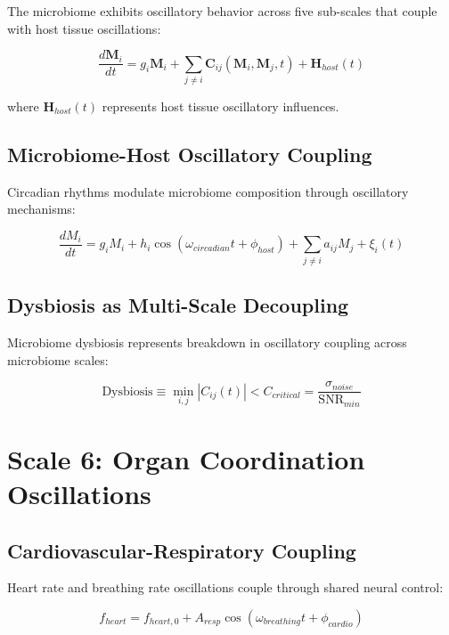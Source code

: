 \documentclass[twocolumn]{article}
\begin{document}
The microbiome exhibits oscillatory behavior across five sub-scales that couple with host tissue oscillations:

\begin{equation}
\frac{d\mathbf{M}_i}{dt} = g_i \mathbf{M}_i + \sum_{j \neq i} \mathbf{C}_{ij}(\mathbf{M}_i, \mathbf{M}_j, t) + \mathbf{H}_{host}(t)
\end{equation}

where $\mathbf{H}_{host}(t)$ represents host tissue oscillatory influences.

\subsection{Microbiome-Host Oscillatory Coupling}

Circadian rhythms modulate microbiome composition through oscillatory mechanisms:

\begin{equation}
\frac{dM_i}{dt} = g_i M_i + h_i \cos(\omega_{circadian}t + \phi_{host}) + \sum_{j \neq i} a_{ij} M_j + \xi_i(t)
\end{equation}

\subsection{Dysbiosis as Multi-Scale Decoupling}

Microbiome dysbiosis represents breakdown in oscillatory coupling across microbiome scales:

\begin{equation}
\text{Dysbiosis} \equiv \min_{i,j} |C_{ij}(t)| < C_{critical} = \frac{\sigma_{noise}}{\text{SNR}_{min}}
\end{equation}

\section{Scale 6: Organ Coordination Oscillations}

\subsection{Cardiovascular-Respiratory Coupling}

Heart rate and breathing rate oscillations couple through shared neural control:

\begin{equation}
f_{heart} = f_{heart,0} + A_{resp} \cos(\omega_{breathing}t + \phi_{cardio})
\end{equation}
\end{document}
